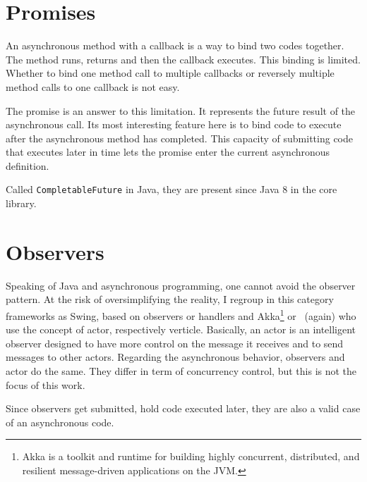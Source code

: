 
\section{Promises}

An asynchronous method with a callback is a way to bind two codes together. The method runs, returns and then the callback executes. This binding is limited. Whether to bind one method call to multiple callbacks or reversely multiple method calls to one callback is not easy. 

The promise is an answer to this limitation. It represents the future result of the asynchronous call. Its most interesting feature here is to bind code to execute after the asynchronous method has completed. This capacity of submitting code that executes later in time lets the promise enter the current asynchronous definition.

Called \lstinline{CompletableFuture} in Java, they are present since Java 8 in the core library.


\section{Observers}

Speaking of Java and asynchronous programming, one cannot avoid the observer pattern. At the risk of oversimplifying the reality, I regroup in this category frameworks as Swing, based on observers or handlers and Akka\footnote{Akka is a toolkit and runtime for building highly concurrent, distributed, and resilient message-driven applications on the JVM.} or \vertx\ (again) who use the concept of actor, respectively verticle. Basically, an actor is an intelligent observer designed to have more control on the message it receives and to send messages to other actors. Regarding the asynchronous behavior, observers and actor do the same. They differ in term of concurrency control, but this is not the focus of this work.

Since observers get submitted, hold code executed later, they are also a valid case of an asynchronous code.
